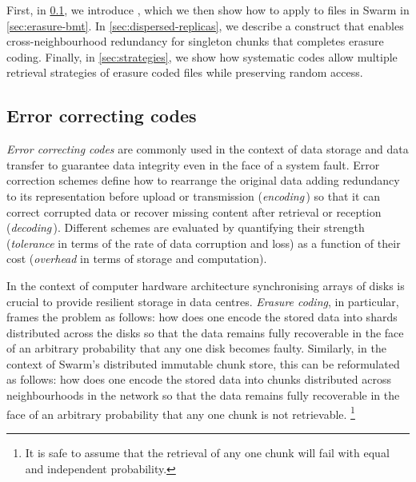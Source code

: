 First, in \ref{sec:error-correcting-codes}, we introduce , which we then show how to apply to files in Swarm in \ref{sec:erasure-bmt}. In \ref{sec:dispersed-replicas}, we describe a construct that enables cross-neighbourhood redundancy for singleton chunks that completes erasure coding. Finally, in \ref{sec:strategies}, we show how systematic codes allow multiple retrieval strategies of erasure coded files  while preserving random access.

\subsection{Error correcting codes \statusgreen}\label{sec:error-correcting-codes}
\enlargethispage*{\baselineskip}
%

\emph{Error correcting codes} are commonly used in the context of data storage and data transfer to guarantee  data integrity even in the face of a system fault. Error correction schemes define how to rearrange the original data adding redundancy to its representation before upload or transmission (\emph{encoding}\,) so that it can correct corrupted data or recover missing content after retrieval or reception (\emph{decoding}\,). Different schemes are evaluated by quantifying their strength (\emph{tolerance} in terms of the rate of data corruption and loss) as a function of their cost (\emph{overhead} in terms of storage and computation). 

In the context of  computer hardware architecture synchronising arrays of disks is crucial to provide resilient storage in data centres.
\emph{Erasure coding},%
%
%
in particular, frames the problem as follows: how does one encode the stored data into shards distributed across the disks so that the data remains fully recoverable in the face of an arbitrary probability that any one disk becomes faulty.
Similarly, in the context of Swarm's distributed immutable chunk store, this can be reformulated as follows: how does one encode the stored data into chunks distributed across neighbourhoods in the network so that the data remains fully recoverable in the face of an arbitrary probability that any one chunk is not retrievable.%
%
\footnote{%
It is safe to assume that the retrieval of any one chunk will fail with equal and independent probability.}


